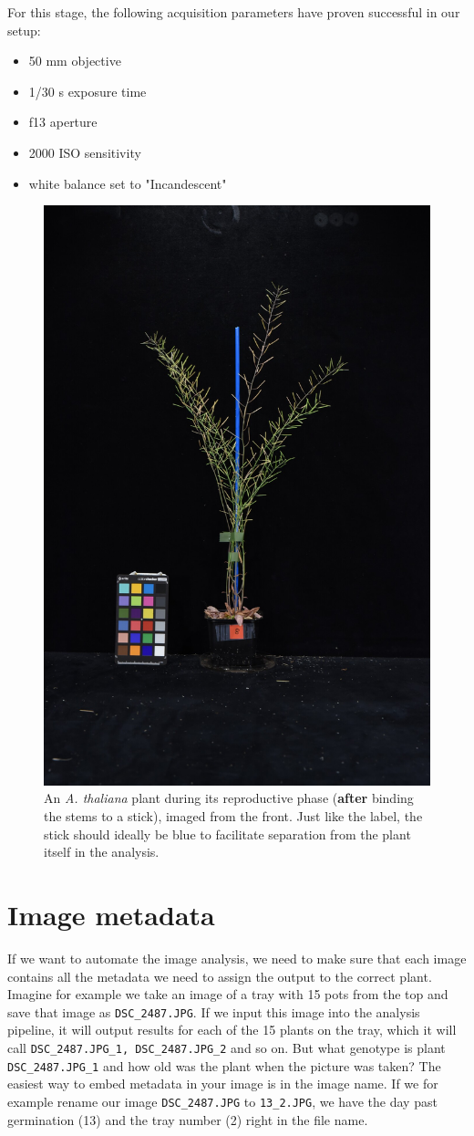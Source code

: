 \documentclass[10pt]{article}
\begin{document}
 	\noindent For this stage, the following acquisition parameters have proven successful in our setup:
 	
 	\begin{itemize}
 		\item 50 mm objective
 		\item 1/30 s exposure time
 		\item f13 aperture
 		\item 2000 ISO sensitivity
 		\item white balance set to "Incandescent"
 	\end{itemize}
 
	 \begin{figure}[!h]
	 	\centering
	 	\includegraphics[width=0.3\linewidth]{20201029_8}
	 	\caption[Example image of a front-view image.]{An \textit{A. thaliana} plant during its reproductive phase (\textbf{after} binding the stems to a stick), imaged from the front. Just like the label, the stick should ideally be blue to facilitate separation from the plant itself in the analysis.}
	 	\label{fig:front_after}
	 \end{figure}
 
 \section{Image metadata\label{prep}}
 
 If we want to automate the image analysis, we need to make sure that each image contains all the metadata we need to assign the output to the correct plant. Imagine for example we take an image of a tray with 15 pots from the top and save that image as \texttt{DSC\_2487.JPG}. If we input this image into the analysis pipeline, it will output results for each of the 15 plants on the tray, which it will call \texttt{DSC\_2487.JPG\_1, DSC\_2487.JPG\_2} and so on. But what genotype is plant \texttt{DSC\_2487.JPG\_1} and how old was the plant when the picture was taken? The easiest way to embed metadata in your image is in the image name. If we for example rename our image \texttt{DSC\_2487.JPG} to \texttt{13\_2.JPG}, we have the day past germination (13) and the tray number (2) right in the file name. 
 
\end{document}
